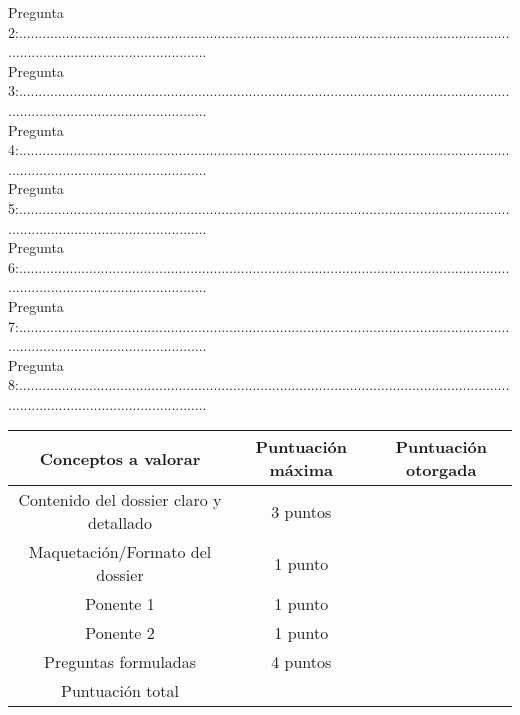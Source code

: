 	Pregunta 2:.................................................................................................................................................................................\\
		
	Pregunta 3:.................................................................................................................................................................................\\
		
	Pregunta 4:.................................................................................................................................................................................\\
		
	Pregunta 5:.................................................................................................................................................................................\\
		
	Pregunta 6:.................................................................................................................................................................................\\
		
	Pregunta 7:.................................................................................................................................................................................\\
		
	Pregunta 8:.................................................................................................................................................................................
	
	\newpage
	\thispagestyle{empty}
	
	\textcolor{White}{ }
	\newpage
	\thispagestyle{empty}
	

	
	\begin{table}[htbp]
		\begin{center}
			\begin{tabular}{|c|c|c|}
				\rowcolor[gray]{0.8}
				\hline
				\textbf{Conceptos a valorar} & \textbf{Puntuación máxima} & \textbf{Puntuación otorgada} \\
				\hline 
				Contenido del dossier claro y detallado & 3 puntos  & \\ \hline
				Maquetación/Formato del dossier & 1 punto & \\ \hline
				Ponente 1 & 1 punto & \\ \hline
				Ponente 2 & 1 punto & \\ \hline
				Preguntas formuladas & 4 puntos & \\ \hline	
				Puntuación total & \multicolumn{2}{|c|}{\textcolor{White}{ }}\\ \hline
			\end{tabular}
		\end{center}
	\end{table}
	\newpage
	\thispagestyle{empty}
	\textcolor{White}{ }
	\newpage